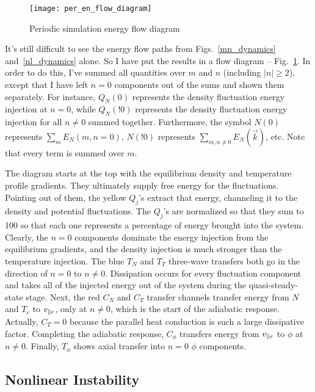 \begin{figure}[!ht]
\centerline{\texttt{[image: per\_en\_flow\_diagram]}}
\caption{Periodic simulation energy flow diagram}
\label{per_en_flow_diagram}
\end{figure}

It's still difficult to see the energy flow paths from Figs.~\ref{mn_dynamics} and~\ref{nl_dynamics} alone. So I have put the results in a flow diagram -- Fig.~\ref{per_en_flow_diagram}. In order to
do this, I've summed all quantities over $m$ and $n$ (including $|n| \ge 2$), 
except that I have left $n=0$ components out of the sums and shown them separately. For instance, $Q_N(0)$ represents the density fluctuation
energy injection at $n=0$, while $Q_N(!0)$ represents the density fluctuation energy injection for all $n \ne 0$ summed together. Furthermore, the symbol $N(0)$ represents 
$\sum_{m}E_N(m,n=0)$,
$N(!0)$ represents $\sum_{m,n \ne 0} E_N(\vec{k})$, etc. Note that every term is summed over $m$.

The diagram starts at the top with the equilibrium density
and temperature profile gradients. They ultimately supply free energy for the fluctuations. Pointing out of them, the yellow $Q_j$'s extract that energy, channeling it
to the density and potential fluctuations. The $Q_j$'s
are normalized so that they sum to 100 so that each one represents a percentage of energy brought into the system. Clearly, the $n=0$ components dominate the energy injection from the equilibrium
gradients, and the density injection is much stronger than the temperature injection. The blue $T_N$ and $T_T$ three-wave transfers both go in the direction of $n=0$ to $n \ne 0$. Dissipation occurs
for every fluctuation component and takes all of the injected energy out of the system during the quasi-steady-state stage. 
Next, the red $C_N$ and $C_T$ transfer channels transfer energy from $N$ and $T_e$ to $v_{\parallel e}$, only at $n \ne 0$, which is the start of the adiabatic response. Actually,
$C_T = 0$ because the parallel heat conduction is such a large dissipative factor. Completing the adiabatic response, $C_\phi$ transfers energy from $v_{\parallel e}$ to $\phi$ at $n \ne 0$. Finally,
$T_\phi$ shows axial transfer into $n=0$ $\phi$ components.


\subsection{Nonlinear Instability}
\label{ss_nl_inst}

